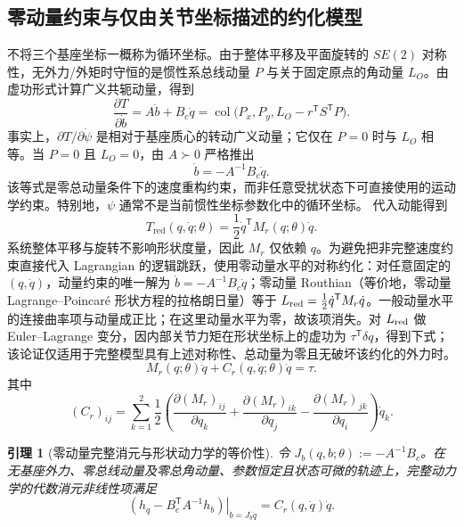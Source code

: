 \documentclass[journal,onecolumn]{IEEEtran}
\newtheorem{lemma}{引理}[section]
\newcommand{\tr}{\mathsf T}
\newcommand{\col}{\operatorname{col}}
\begin{document}
\subsection{零动量约束与仅由关节坐标描述的约化模型}
不将三个基座坐标一概称为循环坐标。由于整体平移及平面旋转的 $SE(2)$ 对称性，无外力/外矩时守恒的是惯性系总线动量 $P$ 与关于固定原点的角动量 $L_O$。由虚功形式计算广义共轭动量，得到
\begin{equation}
 \frac{\partial T}{\partial\dot b}=A\dot b+B_c\dot q
 =\col\bigl(P_x,P_y,L_O-r^\tr S^\tr P\bigr).
 \label{eq:momentum_map}
\end{equation}
事实上，$\partial T/\partial\dot\psi$ 是相对于基座质心的转动广义动量；它仅在 $P=0$ 时与 $L_O$ 相等。当 $P=0$ 且 $L_O=0$，由 $A\succ0$ 严格推出
\begin{equation}
 \boxed{\dot b=-A^{-1}B_c\dot q.}
 \label{eq:connection}
\end{equation}
该等式是零总动量条件下的速度重构约束，而非任意受扰状态下可直接使用的运动学约束。特别地，$\psi$ 通常不是当前惯性坐标参数化中的循环坐标。
代入动能得到
\begin{equation}
 T_{\mathrm{red}}(q,\dot q;\theta)=\frac12\dot q^\tr M_r(q;\theta)\dot q.
 \label{eq:Tred}
\end{equation}
系统整体平移与旋转不影响形状度量，因此 $M_r$ 仅依赖 $q$。为避免把非完整速度约束直接代入 Lagrangian 的逻辑跳跃，使用零动量水平的对称约化：对任意固定的 $(q,\dot q)$，动量约束的唯一解为 $\dot b=-A^{-1}B_c\dot q$；零动量 Routhian（等价地，零动量 Lagrange--Poincar\'e 形状方程的拉格朗日量）等于 $L_{\rm red}=\tfrac12\dot q^\tr M_r\dot q$。一般动量水平的连接曲率项与动量成正比；在这里动量水平为零，故该项消失。对 $L_{\rm red}$ 做 Euler--Lagrange 变分，因内部关节力矩在形状坐标上的虚功为 $\tau^\tr\delta q$，得到下式；该论证仅适用于完整模型具有上述对称性、总动量为零且无破坏该约化的外力时。
\begin{equation}
 \boxed{M_r(q;\theta)\ddot q+C_r(q,\dot q;\theta)\dot q=\tau.}
 \label{eq:reducedzero}
\end{equation}
其中
\begin{equation}
 (C_r)_{ij}=\sum_{k=1}^2\frac12\left(\frac{\partial (M_r)_{ij}}{\partial q_k}+\frac{\partial(M_r)_{ik}}{\partial q_j}-\frac{\partial(M_r)_{jk}}{\partial q_i}\right)\dot q_k.
 \label{eq:Cr}
\end{equation}
\begin{lemma}[零动量完整消元与形状动力学的等价性]
令 $J_b(q,b;\theta):=-A^{-1}B_c$。在无基座外力、零总线动量及零总角动量、参数恒定且状态可微的轨迹上，完整动力学的代数消元非线性项满足
\begin{equation}
 \boxed{\left.\left(h_q-B_c^\tr A^{-1}h_b\right)\right|_{\dot b=J_b\dot q}=C_r(q,\dot q)\dot q.}\label{eq:directequiv}
\end{equation}
\end{lemma}
\end{document}
